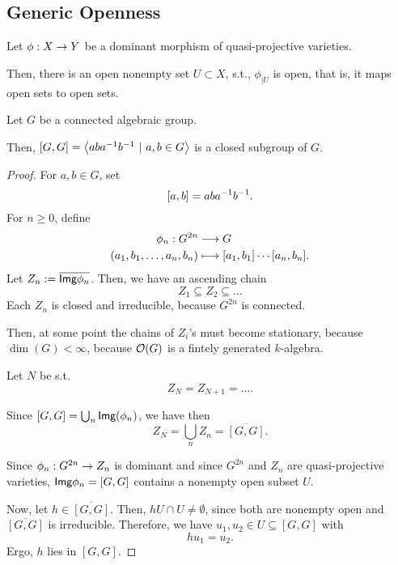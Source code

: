 \subsection{Generic Openness}
\begin{proposition}
Let $\phi : X \overset{}{\rightarrow} Y$ be a dominant morphism of quasi-projective varieties.

Then, there is an open nonempty set $U \subset X$, s.t., $\phi_{|U}$ is open, that is, it maps open sets to open sets.
\end{proposition}

\begin{corollary}
	Let $G$ be a connected algebraic group.
	
	Then, $[G,G] = \left<aba^{-1} b^{-1} ~|~a,b \in G\right>$ is a closed subgroup of $G$.
\end{corollary}
\begin{proof}
	For $a,b \in G$, set
	\[ [a,b] = aba^{-1} b^{-1}. \]
	For $n\geq 0$, define
	\begin{align*}
	\phi_n : G^{2n} &\overset{}{\longrightarrow} G\\
	(a_1,b_1,\ldots, a_n,b_n) & \longmapsto [a_1, b_1] \cdots [a_n, b_n].
	\end{align*}
	Let $Z_n := \overline{\textsf{Img} \phi_n}$.
	Then, we have an ascending chain
	\[ Z_1 \subseteq Z_2 \subseteq \ldots \]
	Each $Z_n$ is closed and irreducible, because $G^{2n}$ is connected.
	
	Then, at some point the chains of $Z_i$'s must become stationary, because $\dim(G) < \infty$, because $\mathcal{O}(G)$ is a fintely generated $k$-algebra.
	
	Let $N$ be s.t.
	\[ Z_N = Z_{N+1} = \ldots. \]
	
	Since $[G,G] = \bigcup_n \textsf{Img}(\phi_n)$, we have then
	\[ Z_N = \bigcup_n Z_n = \overline{[G,G]}. \]
	
	Since $\phi_n : G^{2n} \overset{}{\rightarrow} Z_n$ is dominant and since $G^{2n}$ and $Z_n$ are quasi-projective varieties, $\textsf{Img} \phi_n = [G,G]$ contains a nonempty open subset $U$.
	
	Now, let $h \in \overline{[G,G]}$. Then, $hU\cap U\neq \emptyset$, since both are nonempty open and $\overline{[G,G]}$ is irreducible. Therefore, we have $u_1, u_2 \in U \subseteq [G,G]$ with
	\[ hu_1 = u_2. \]
	Ergo, $h$ lies in $[G,G]$. 
\end{proof}